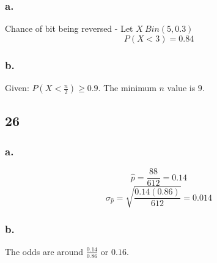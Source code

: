 \documentclass[11pt]{article}
\begin{document}
\subsubsection{a.}
Chance of bit being reversed - Let $X~Bin(5, 0.3)$ 
\[P(X<3) = 0.84 \]

\subsubsection{b.}
Given: $P(X<\frac{n}{2}) \ge 0.9$. The minimum $n$ value is $9$.
\subsection{26}
\subsubsection{a.}
\[\hat{p} = \frac{88}{612} = 0.14 \]
\[\sigma_{\hat{p}} = \sqrt{\frac{0.14(0.86)}{612}} = 0.014 \]
\subsubsection{b.}
The odds are around $\frac{0.14}{0.86}$ or $0.16$.
\end{document}
